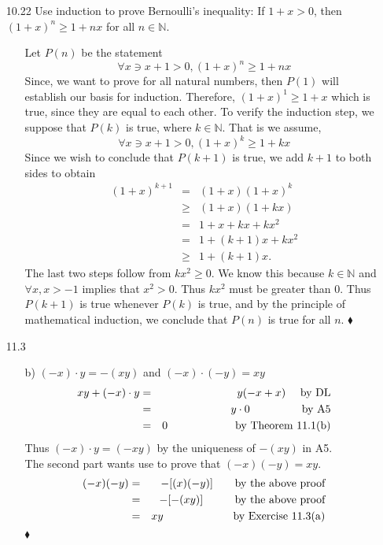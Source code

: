 \documentclass[12pt]{article}
\begin{document}
\begin{enumerate}
\item[10.22] Use induction to prove Bernoulli's inequality: If $1 + x > 0$, then $(1 + x)^n \geq 1 + nx$ for all $n \in \mathbb{N}$.
\begin{enumerate}
\item[] Let $P(n)$ be the statement \[
\forall x \ni x + 1 > 0, (1 + x)^n \geq 1 + nx
\]
Since, we want to prove for all natural numbers, then $P(1)$ will establish our
basis for induction. Therefore, $(1 + x)^1 \geq 1 + x$ which is true, since they are
equal to each other. To verify the induction step, we suppose that $P(k)$ is 
true, where $k \in \mathbb{N}$. That is we assume, \[
\forall x \ni x + 1 > 0, (1 + x)^k \geq 1 + kx
\]
Since we wish to conclude that $P(k + 1)$ is true, we add $k + 1$ to both sides to obtain
\begin{eqnarray*}
(1 + x)^{k + 1} &=& (1 + x)(1 + x)^k \\
&\geq& (1 + x)(1 + kx) \\
&=& 1 + x + kx + kx^2 \\
&=& 1 + (k + 1)x + kx^2 \\
&\geq& 1 + (k + 1)x.
\end{eqnarray*}
The last two steps follow from $kx^2 \geq 0$. We know this because $k \in \mathbb{N}$ and 
$\forall x, x > -1$ implies that $x^2 > 0$. Thus $kx^2$ must be greater than $0$.
Thus $P(k + 1)$ is true whenever $P(k)$ is true, 
and by the principle of mathematical induction, we conclude that $P(n)$ is true for 
all $n$. $\blacklozenge$
\end{enumerate}

\item[11.3]
\begin{enumerate}
\item[b)] 
$(-x) \cdot y = -(xy)$ and $(-x) \cdot (-y) = xy$
\begin{eqnarray*}
xy + (-x) \cdot y &=& y(-x + x) \quad \mbox{  by DL} \\
&=& y \cdot 0 \hskip 1.55cm \mbox{  by A5} \\
&=& 0 \hskip 2.05cm \mbox{  by Theorem 11.1(b)}
\end{eqnarray*}
Thus $(-x) \cdot y = (-xy)$ by the uniqueness of $-(xy)$ in A5. 
\[ \]
The second part wants use to prove that $(-x)(-y) = xy$.
\begin{eqnarray*}
(-x)(-y) &=& -[(x)(-y)] \hskip 0.7cm \mbox{by the above proof} \\
&=& -[-(xy)] \hskip 1.02cm \mbox{by the above proof} \\
&=& xy \hskip 2.12cm \mbox{  by Exercise 11.3(a)}
\end{eqnarray*}
$\blacklozenge$


\end{enumerate}
\end{enumerate}
\end{document}
